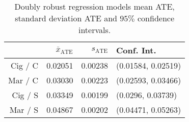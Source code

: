 \begin{table}[ht]
\centering
\begin{tabular}{rrrl}
  \hline
 & $\bar{x}_{\text{ATE}}$ & $s_{\text{ATE}}$ & Conf. Int. \\ 
  \hline
Cig / C & 0.02051 & 0.00238 & (0.01584, 0.02519) \\ 
  Mar / C & 0.03030 & 0.00223 & (0.02593, 0.03466) \\ 
  Cig / S & 0.03349 & 0.00199 & (0.0296, 0.03739) \\ 
  Mar / S & 0.04867 & 0.00202 & (0.04471, 0.05263) \\ 
   \hline
\end{tabular}
\caption{Doubly robust regression models mean ATE, standard deviation ATE and $95\%$ confidence intervals.}
\end{table}

